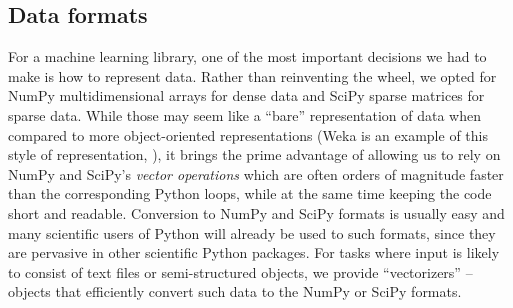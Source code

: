 \documentclass{llncs}
\newcommand{\Xtr}{\texttt{X\_tr}}
\newcommand{\Xte}{\texttt{X\_te}}
\newcommand{\ytr}{\texttt{y\_tr}}
\newcommand{\yte}{\texttt{y\_te}}
\begin{document}
\subsection{Data formats}

For a machine learning library, one of the most important decisions we had to
make is how to represent data.  Rather than reinventing the wheel, we opted for
NumPy multidimensional arrays  for dense data and SciPy
sparse matrices for sparse data.  While those may seem like a ``bare''
representation of data when compared to more object-oriented representations
(Weka is an example of this style of representation, \citealp{hall2009weka}),
it brings the prime advantage of allowing us to rely on NumPy and SciPy's
\textit{vector operations} which are often orders of magnitude faster
than the corresponding Python loops,
while at the same time keeping the code short and readable.
Conversion to NumPy and SciPy formats is usually easy and many scientific users
of Python will already be used to such formats, since they are pervasive in
other scientific Python packages.  For tasks where input is likely to consist
of text files or semi-structured objects, we provide ``vectorizers'' -- objects
that efficiently convert such data to the NumPy or SciPy formats.

\end{document}
